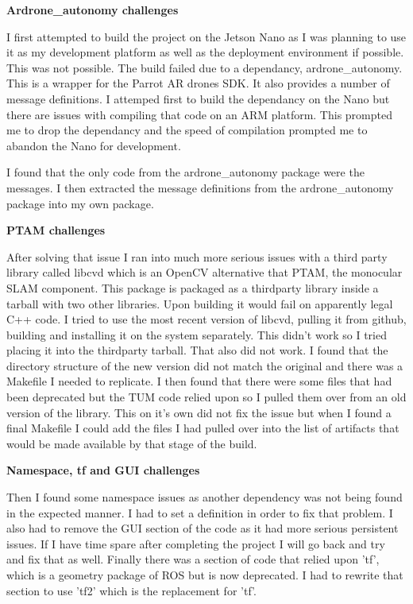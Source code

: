 \documentclass[]{../resources/final_report}
\begin{document}
\textbf{Ardrone\_autonomy challenges}

I first attempted to build the project on the Jetson Nano as I was planning to use it as my development platform as well as the deployment environment if possible. This was not possible. The build failed due to a dependancy, ardrone\_autonomy. This is a wrapper for the Parrot AR drones SDK. It also provides a number of message definitions. I attemped first to build the dependancy on the Nano but there are issues with compiling that code on an ARM platform. This prompted me to drop the dependancy and the speed of compilation prompted me to abandon the Nano for development.

I found that the only code from the ardrone\_autonomy package were the messages. I then extracted the message definitions from the ardrone\_autonomy package into my own package.

\textbf{PTAM challenges}

After solving that issue I ran into much more serious issues with a third party library called libcvd which is an OpenCV alternative that PTAM, the monocular SLAM component. This package is packaged as a thirdparty library inside a tarball with two other libraries. Upon building it would fail on apparently legal C++ code. I tried to use the most recent version of libcvd, pulling it from github, building and installing it on the system separately. This didn't work so I tried placing it into the thirdparty tarball. That also did not work. I found that the directory structure of the new version did not match the original and there was a Makefile I needed to replicate. I then found that there were some files that had been deprecated but the TUM code relied upon so I pulled them over from an old version of the library. This on it's own did not fix the issue but when I found a final Makefile I could add the files I had pulled over into the list of artifacts that would be made available by that stage of the build. 

\textbf{Namespace, tf and GUI challenges}

Then I found some namespace issues as another dependency was not being found in the expected manner. I had to set a definition in order to fix that problem. I also had to remove the GUI section of the code as it had more serious persistent issues. If I have time spare after completing the project I will go back and try and fix that as well. Finally there was a section of code that relied upon 'tf', which is a geometry package of ROS but is now deprecated. I had to rewrite that section to use 'tf2' which is the replacement for 'tf'.
\end{document}
